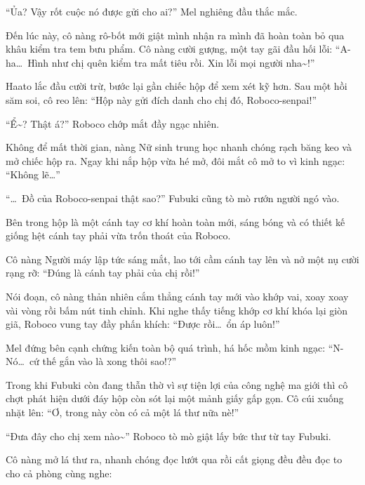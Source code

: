 \documentclass[../main.tex]{subfiles}
\begin{document}
``Ủa? Vậy rốt cuộc nó được gửi cho ai?'' Mel nghiêng đầu thắc mắc.

Đến lúc này, cô nàng rô-bốt mới giật mình nhận ra mình đã hoàn toàn bỏ qua khâu kiểm tra tem bưu phẩm. Cô nàng cười gượng, một tay gãi đầu hối lỗi: ``A-ha\dots\ Hình như chị quên kiểm tra mất tiêu rồi. Xin lỗi mọi người nha\~{}!''

Haato lắc đầu cười trừ, bước lại gần chiếc hộp để xem xét kỹ hơn. Sau một hồi săm soi, cô reo lên: ``Hộp này gửi đích danh cho chị đó, Roboco-senpai!''

``Ể\~{}? Thật á?'' Roboco chớp mắt đầy ngạc nhiên.

Không để mất thời gian, nàng Nữ sinh trung học nhanh chóng rạch băng keo và mở chiếc hộp ra. Ngay khi nắp hộp vừa hé mở, đôi mắt cô mở to vì kinh ngạc: ``Không lẽ\dots''

``\dots\ Đồ của Roboco-senpai thật sao?'' Fubuki cũng tò mò rướn người ngó vào.

Bên trong hộp là một cánh tay cơ khí hoàn toàn mới, sáng bóng và có thiết kế giống hệt cánh tay phải vừa trốn thoát của Roboco.

Cô nàng Người máy lập tức sáng mắt, lao tới cầm cánh tay lên và nở một nụ cười rạng rỡ: ``Đúng là cánh tay phải của chị rồi!''

Nói đoạn, cô nàng thản nhiên cắm thẳng cánh tay mới vào khớp vai, xoay xoay vài vòng rồi bấm nút tinh chỉnh. Khi nghe thấy tiếng khớp cơ khí khóa lại giòn giã, Roboco vung tay đầy phấn khích: ``Được rồi\dots\ ổn áp luôn!''

Mel đứng bên cạnh chứng kiến toàn bộ quá trình, há hốc mồm kinh ngạc: ``N-Nó\dots\ cứ thế gắn vào là xong thôi sao!?''

Trong khi Fubuki còn đang thẫn thờ vì sự tiện lợi của công nghệ ma giới thì cô chợt phát hiện dưới đáy hộp còn sót lại một mảnh giấy gấp gọn. Cô cúi xuống nhặt lên: ``Ơ, trong này còn có cả một lá thư nữa nè!''

``Đưa đây cho chị xem nào\~{}'' Roboco tò mò giật lấy bức thư từ tay Fubuki.

Cô nàng mở lá thư ra, nhanh chóng đọc lướt qua rồi cất giọng đều đều đọc to cho cả phòng cùng nghe:

\end{document}
